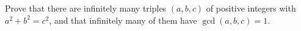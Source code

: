 Prove that there are infinitely many triples $(a,b,c)$ of positive integers with $a^2+b^2=c^2$, and that infinitely many of them have $\gcd(a,b,c)=1$.
